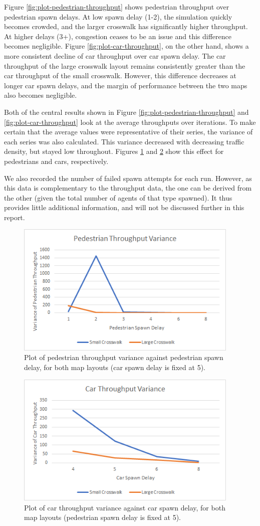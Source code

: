 Figure \ref{fig:plot-pedestrian-throughput} shows pedestrian throughput over pedestrian spawn delays. At low spawn delay (1-2), the simulation quickly becomes crowded, and the larger crosswalk has significantly higher throughput. At higher delays (3+), congestion ceases to be an issue and this difference becomes negligible. Figure \ref{fig:plot-car-throughput}, on the other hand, shows a more consistent decline of car throughput over car spawn delay. The car throughput of the large crosswalk layout remains consistently greater than the car throughput of the small crosswalk. However, this difference decreases at longer car spawn delays, and the margin of performance between the two maps also becomes negligible.

Both of the central results shown in Figure \ref{fig:plot-pedestrian-throughput} and \ref{fig:plot-car-throughput} look at the average throughputs over iterations. To make certain that the average values were representative of their series, the variance of each series was also calculated. This variance decreased with decreasing traffic density, but stayed low throughout. Figures \ref{fig:plot-pedestrian-variance} and \ref{fig:plot-car-variance} show this effect for pedestrians and cars, respectively.

We also recorded the number of failed spawn attempts for each run. However, as this data is complementary to the throughput data, the one can be derived from the other (given the total number of agents of that type spawned). It thus provides little additional information, and will not be discussed further in this report.

\begin{figure}[h]
    \centering
    \includegraphics[width=4.2in]{images/plot-pedestrian-variance.png}
    \caption{Plot of pedestrian throughput variance against pedestrian spawn delay, for both map layouts (car spawn delay is fixed at 5).}
    \label{fig:plot-pedestrian-variance}
\end{figure}

\begin{figure}[h]
    \centering
    \includegraphics[width=4.2in]{images/plot-car-variance.png}
    \caption{Plot of car throughput variance against car spawn delay, for both map layouts (pedestrian spawn delay is fixed at 5).}
    \label{fig:plot-car-variance}
\end{figure}